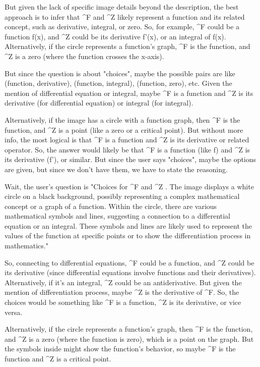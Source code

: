 But given the lack of specific image details beyond the description, the best approach is to infer that ^F and ^Z likely represent a function and its related concept, such as derivative, integral, or zero. So, for example, ^F could be a function f(x), and ^Z could be its derivative f'(x), or an integral of f(x). Alternatively, if the circle represents a function's graph, ^F is the function, and ^Z is a zero (where the function crosses the x-axis). 

But since the question is about "choices", maybe the possible pairs are like (function, derivative), (function, integral), (function, zero), etc. Given the mention of differential equation or integral, maybe ^F is a function and ^Z is its derivative (for differential equation) or integral (for integral). 

Alternatively, if the image has a circle with a function graph, then ^F is the function, and ^Z is a point (like a zero or a critical point). But without more info, the most logical is that ^F is a function and ^Z is its derivative or related operator. So, the answer would likely be that ^F is a function (like f) and ^Z is its derivative (f'), or similar. But since the user says "choices", maybe the options are given, but since we don't have them, we have to state the reasoning. 

Wait, the user's question is "Choices for ^F and ^Z . The image displays a white circle on a black background, possibly representing a complex mathematical concept or a graph of a function. Within the circle, there are various mathematical symbols and lines, suggesting a connection to a differential equation or an integral. These symbols and lines are likely used to represent the values of the function at specific points or to show the differentiation process in mathematics." 

So, connecting to differential equations, ^F could be a function, and ^Z could be its derivative (since differential equations involve functions and their derivatives). Alternatively, if it's an integral, ^Z could be an antiderivative. But given the mention of differentiation process, maybe ^Z is the derivative of ^F. So, the choices would be something like ^F is a function, ^Z is its derivative, or vice versa. 

Alternatively, if the circle represents a function's graph, then ^F is the function, and ^Z is a zero (where the function is zero), which is a point on the graph. But the symbols inside might show the function's behavior, so maybe ^F is the function and ^Z is a critical point. 

